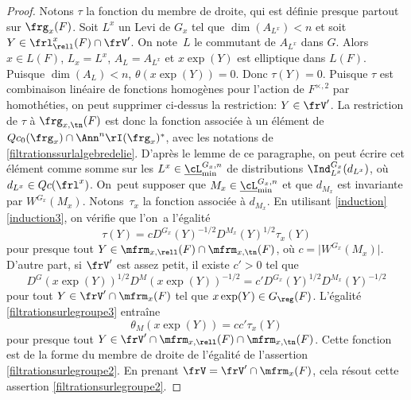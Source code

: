 \begin{proof}
Notons $\tau$ la fonction du membre de droite, qui est définie presque partout sur $\frg_{x}(F)$.
Soit $L^x$ un Levi de $G_{x}$ tel que $\dim(A_{L^x})<n$ et soit $Y\in \frl^x_{\rell}(F)\cap \frV'$. On note~$L$ le commutant de $A_{L^x}$ dans $G$. Alors $x\in L(F)$, $L_{x}=L^x$, $A_{L}=A_{L^x}$ et $x \exp(Y)$ est elliptique dans $L(F)$. Puisque $\dim(A_{L})<n$, $\theta(x \exp(Y))=0$. Donc $\tau(Y)=0$. Puisque $\tau$ est combinaison linéaire de fonctions homogènes pour l'action de $F^{\times,2}$ par homothéties, on peut supprimer ci-dessus la restriction: $Y\in \frV'$. La restriction de $\tau$ à $\frg_{x,\tn}(F)$ est donc la fonction associée à un élément de $Qc_{0}(\frg_{x})\cap \Ann^{n}\rI(\frg_{x})^*$, avec les notations de \ref{filtrationssurlalgebredelie}. D'après le lemme de ce paragraphe, on peut écrire cet élément comme somme sur les $L^x\in \underline{\cL}_{\min}^{G_{x},n}$ de distributions $\Ind_{L^x}^{G_{x}}(d_{L^x})$, où $d_{L^x}\in Qc(\frl^x)$. On~peut supposer que $M_{x}\in \underline{\cL}_{\min}^{G_{x},n}$ et que $d_{M_{x}}$ est invariante par $ W^{G_{x}}(M_{x})$. Notons~$\tau_{x}$ la fonction associée à $d_{M_{x}}$. En utilisant \ref{induction}\,\eqref{induction3}, on vérifie que l'on~a l'égalité
\[
\tau(Y)=cD^{G_{x}}(Y)^{-1/2}D^{M_{x}}(Y)^{1/2}\tau_{x}(Y)
\]
pour presque tout $Y\in
\mfrm_{x,\rell}(F)\cap \mfrm_{x,\tn}(F)$, où $c=\vert W^{G_{x}}(M_{x})\vert $. D'autre part, si $\frV'$ est assez petit, il existe $c'>0$ tel que
\[
D^G(x \exp(Y))^{1/2}D^M(x \exp(Y))^{-1/2}=c'D^{G_{x}}(Y)^{1/2}D^{M_{x}}(Y)^{-1/2}
\]
pour tout $Y\in \frV'\cap \mfrm_{x}(F)$ tel que $x \exp(Y)\in G_{\reg}(F)$. L'égalité \eqref{filtrationsurlegroupe3} entraîne
\[
\theta_{M}(x \exp(Y))=cc'\tau_{x}(Y)
\]
pour presque tout $Y\in
\frV'\cap\mfrm_{x,\rell}(F)\cap \mfrm_{x,\tn}(F)$.
Cette fonction est de la forme du membre de droite de l'égalité de l'assertion \eqref{filtrationsurlegroupe2}. En prenant $\frV=\frV'\cap \mfrm_{x}(F)$, cela résout cette assertion \eqref{filtrationsurlegroupe2}.


\end{proof}
